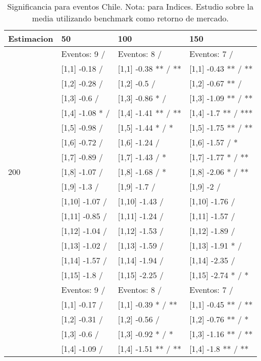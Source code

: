 \begin{table}

\caption{Significancia para eventos Chile. Nota: para Indices. Estudio sobre la media utilizando benchmark como retorno de mercado.}
\centering
\begin{tabular}[t]{llll}
\toprule
Estimacion & 50 & 100 & 150\\
\midrule
 & Eventos:  9 / & Eventos:  8 / & Eventos:  7 /\\
 & {}[1,1] -0.18  / & {}[1,1] -0.38 ** / ** & {}[1,1] -0.43 ** / **\\
 & {}[1,2] -0.28  / & {}[1,2] -0.5  / & {}[1,2] -0.67 ** /\\
 & {}[1,3] -0.6  / & {}[1,3] -0.86 * / & {}[1,3] -1.09 ** / **\\
 & {}[1,4] -1.08 * / & {}[1,4] -1.41 ** / ** & {}[1,4] -1.7 ** / ***\\
\addlinespace
 & {}[1,5] -0.98  / & {}[1,5] -1.44 * / * & {}[1,5] -1.75 ** / **\\
 & {}[1,6] -0.72  / & {}[1,6] -1.24  / & {}[1,6] -1.57  / *\\
 & {}[1,7] -0.89  / & {}[1,7] -1.43  / * & {}[1,7] -1.77 * / **\\
200 & {}[1,8] -1.07  / & {}[1,8] -1.68  / * & {}[1,8] -2.06 * / **\\
 & {}[1,9] -1.3  / & {}[1,9] -1.7  / & {}[1,9] -2  /\\
\addlinespace
 & {}[1,10] -1.07  / & {}[1,10] -1.43  / & {}[1,10] -1.76  /\\
 & {}[1,11] -0.85  / & {}[1,11] -1.24  / & {}[1,11] -1.57  /\\
 & {}[1,12] -1.04  / & {}[1,12] -1.53  / & {}[1,12] -1.89  /\\
 & {}[1,13] -1.02  / & {}[1,13] -1.59  / & {}[1,13] -1.91 * /\\
 & {}[1,14] -1.57  / & {}[1,14] -1.94  / & {}[1,14] -2.35  /\\
\addlinespace
 & {}[1,15] -1.8  / & {}[1,15] -2.25  / & {}[1,15] -2.74 * / *\\
 & Eventos:  9 / & Eventos:  8 / & Eventos:  7 /\\
 & {}[1,1] -0.17  / & {}[1,1] -0.39 * / ** & {}[1,1] -0.45 ** / **\\
 & {}[1,2] -0.31  / & {}[1,2] -0.56  / & {}[1,2] -0.76 ** / *\\
 & {}[1,3] -0.6  / & {}[1,3] -0.92 * / * & {}[1,3] -1.16 ** / **\\
\addlinespace
 & {}[1,4] -1.09  / & {}[1,4] -1.51 ** / ** & {}[1,4] -1.8 ** / **\\

\end{tabular}
\end{table}
